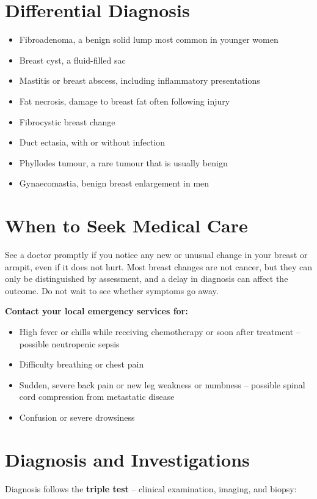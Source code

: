 \section*{Differential Diagnosis}
\begin{itemize}
    \item Fibroadenoma, a benign solid lump most common in younger women
    \item Breast cyst, a fluid-filled sac
    \item Mastitis or breast abscess, including inflammatory presentations
    \item Fat necrosis, damage to breast fat often following injury
    \item Fibrocystic breast change
    \item Duct ectasia, with or without infection
    \item Phyllodes tumour, a rare tumour that is usually benign
    \item Gynaecomastia, benign breast enlargement in men
\end{itemize}

\section*{When to Seek Medical Care}
See a doctor promptly if you notice any new or unusual change in your breast or armpit, even if it does not hurt. Most breast changes are not cancer, but they can only be distinguished by assessment, and a delay in diagnosis can affect the outcome. Do not wait to see whether symptoms go away.

\textbf{Contact your local emergency services for:}
\begin{itemize}
    \item High fever or chills while receiving chemotherapy or soon after treatment -- possible neutropenic sepsis
    \item Difficulty breathing or chest pain
    \item Sudden, severe back pain or new leg weakness or numbness -- possible spinal cord compression from metastatic disease
    \item Confusion or severe drowsiness
\end{itemize}

\section*{Diagnosis and Investigations}
Diagnosis follows the \textbf{triple test} -- clinical examination, imaging, and biopsy:

